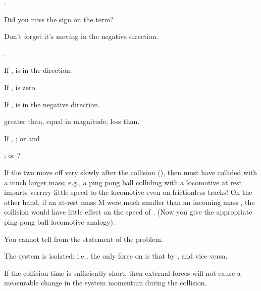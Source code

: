 {{\begin{two-digit-list}
\item [13.] .

           Did you miss the sign on the  term?

           Don't forget it's moving in the negative  direction.

\item [14.] .

           If ,  is in the  direction.

           If ,  is zero.

           If ,  is in the negative  direction.

\item [15.] greater than, equal in magnitude, less than.

\item [16.] If , ; or  and
           .

\item [17.] ;
           or ?

\item [18.] If the two move off very slowly after the collision (),
           then  must have collided with a much larger mass; e.g., a ping
           pong ball colliding with a locomotive at rest imparts verrrry little
           speed to the locomotive \m{\ldots} even on frictionless tracks!
           On the other hand, if an at-rest mass M were much smaller than an
           incoming mass , the collision would have little effect on the
           speed of .
           (Now you give the appropriate ping pong ball-locomotive analogy).

\item [19.] You cannot tell from the statement of the problem.

\item [20.] The system is isolated; i.e., the only force on  is that by ,
           and vice versa.

\item [21.] If the collision time is sufficiently short, then external forces
           will not cause a measurable change in the system momentum during the
           collision.

\item [22.] \noindent{}\newline


\end{two-digit-list}}}
